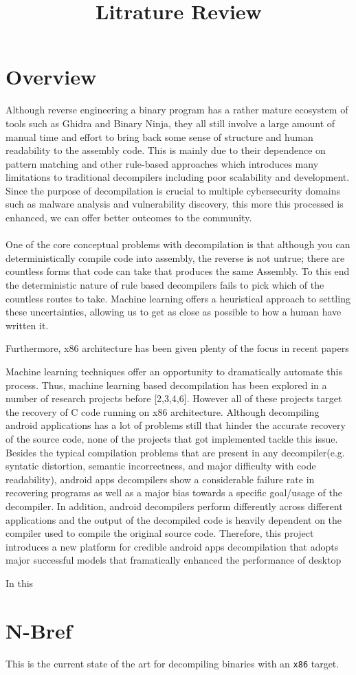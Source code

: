 \documentclass{article}
\title{Litrature Review}
\begin{document}
	\maketitle

\section{Overview}
Although reverse engineering a binary program has a rather mature ecosystem of tools such as Ghidra and Binary Ninja, they all still involve a large amount of manual time and effort to bring back some sense of structure and human readability to the assembly code. This is mainly due to their dependence on pattern matching and other rule-based approaches which introduces many limitations to traditional decompilers including poor scalability and development. Since the purpose of decompilation is crucial to multiple cybersecurity domains such as malware analysis and vulnerability discovery, this more this processed is enhanced, we can offer better outcomes to the community. \\\\

One of the core conceptual problems with decompilation is that although you can deterministically compile code into assembly, the reverse is not untrue; there are countless forms that code can take that produces the same Assembly.
To this end the deterministic nature of rule based decompilers fails to pick which of the countless routes to take.
Machine learning offers a heuristical approach to settling these uncertainties, allowing us to get as close as possible to how a human have written it.

Furthermore, x86 architecture has been given plenty of the focus in recent papers 

\noindent Machine learning techniques offer an opportunity to dramatically automate this process. Thus, machine learning based decompilation has been explored in a number of research projects before [2,3,4,6]. However all of these projects target the recovery of C code running on x86 architecture. Although decompiling android applications has a lot of problems still that hinder the accurate recovery of the source code, none of the projects that got implemented tackle this issue. Besides the typical compilation problems that are present in any decompiler(e.g. syntatic distortion, semantic incorrectness, and major difficulty with code readability), android apps decompilers show a considerable failure rate in recovering programs as well as a major bias towards a specific goal/usage of the decompiler. In addition, android decompilers perform differently across different applications and the output of the decompiled code is heavily dependent on the compiler used to compile the original source code. Therefore, this project introduces a new platform for credible android apps decompilation that adopts major successful models that framatically enhanced the performance of desktop  

In this 
	\section{N-Bref}

	This is the current state of the art for decompiling binaries with an \verb|x86| target.
\end{document}
